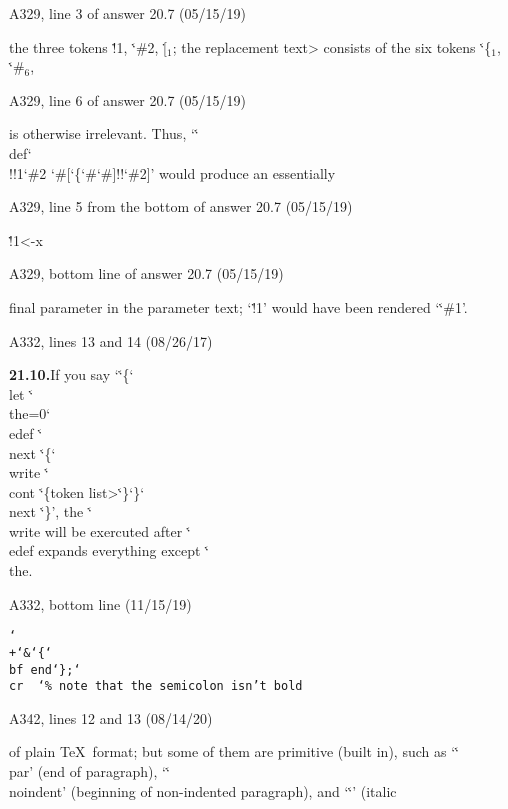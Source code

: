 \bugonpage A329, line 3 of answer 20.7 (05/15/19)

\ninepoint\noindent
the three tokens \.{!1}, \.{\char`\#2}, \.{[}$_1$; the
\<replacement text> consists of the six tokens
\.{\char`\{}$_1$, \.{\char`\#}$_6$,\cutpar

\bugonpage A329, line 6 of answer 20.7 (05/15/19)

\ninepoint\noindent
is otherwise irrelevant. Thus, `\.{\char`\\def\char`\\!!1\char`\#2\char
 `\#[\char`\{\char`\#\char`\#]!!\char`\#2]}'
would produce an essentially\cutpar

\bugonpage A329, line 5 from the bottom of answer 20.7 (05/15/19)

\ninepoint\indent
\.{!1<-x}

\bugonpage A329, bottom line of answer 20.7 (05/15/19)

\ninepoint\noindent
final parameter in the parameter text;
`\.{!1}' would have been rendered `\.{\char`\#1}'.

\bugonpage A332, lines 13 and 14 (08/26/17)

\ninepoint\noindent
{\bf 21.10.}\enspace If you say
`\.{\char`\{\char`\\let}\stretch
\.{\char`\\the=0\char`\\edef}\stretch
\.{\char`\\next}\stretch
\.{\char`\{\char`\\write}\stretch
\.{\char`\\cont}\stretch
\.{\char`\{}\<token list>\.{\char`\}\char`\}\char`\\next}\stretch
\.{\char`\}}',
the \.{\char`\\write} will be exercuted after
\.{\char`\\edef} expands everything except \.{\char`\\the}.

\bugonpage A332, bottom line (11/15/19)

\ninepoint\indent\quad
\tt \char`\\+\char`\&\char`\{\char`\\bf end\char`\};\char`\\cr \
 \char`\%\ note that the semicolon isn't bold

\bugonpage A342, lines 12 and 13 (08/14/20)

\tenpoint\noindent
of plain \TeX\ format; but some of them are primitive (built in),
such as `\.{\char`\\par}' (end of
paragraph), `\.{\char`\\noindent}' (beginning of
non-indented paragraph), and `\.{\char`\/}' (italic\cutpar

